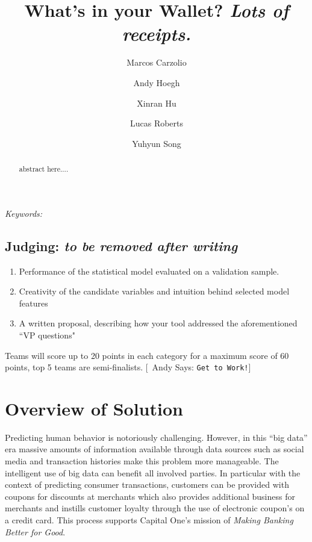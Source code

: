 \documentclass[12pt]{article} %
\begin{document}
\def\spacingset#1{\renewcommand{\baselinestretch}%
{#1}\small\normalsize} \spacingset{1}




  \title{\bf What's in your Wallet? \emph{ Lots of receipts.}}
  \author[1]{Marcos Carzolio}
  \author[1]{Andy Hoegh}
  \author[1]{Xinran Hu}
  \author[1]{Lucas Roberts}
  \author[1]{Yuhyun Song}
 \maketitle

\bigskip
\begin{abstract}
\noindent
abstract here....
\end{abstract}

\noindent%
{\it Keywords:} 
\vfill

\newpage


\newcommand{\ac}[1]{[{\color{red}\ Andy Says: {\tt #1}}]}
\newcommand{\xc}[1]{[{\color{red}\ Xinran Says: {\tt #1}}]}
\newcommand{\lc}[1]{[{\color{red}\ Lucas Says: {\tt #1}}]}
\newcommand{\mc}[1]{[{\color{red}\ Marcos Says: {\tt #1}}]}
\newcommand{\yc}[1]{[{\color{red}\ Yuhyun Says: {\tt #1}}]}

\subsection{Judging: \emph{to be removed after writing}}
\begin{enumerate}
\item Performance of the statistical model evaluated on a validation sample.
\item Creativity of the candidate variables and intuition behind selected model features
\item A written proposal, describing how your tool addressed the aforementioned ``VP questions"
\end {enumerate}
Teams will score up to 20 points in each category for a maximum score of 60 points, top 5 teams are semi-finalists.
\ac{Get to Work!}
\section{Overview of Solution} 
Predicting human behavior is notoriously challenging.  However, in this ``big data'' era massive amounts of information available through data sources such as social media and transaction histories make this problem more manageable.   The intelligent use of big data can benefit all involved parties.  In particular  with the context of predicting consumer transactions, customers can be provided with coupons for discounts at merchants  which also provides additional business for merchants and instills customer loyalty through the use of electronic coupon's on a credit card.  This process supports Capital One's mission of \emph{Making Banking Better for Good}.  
\end{document}
